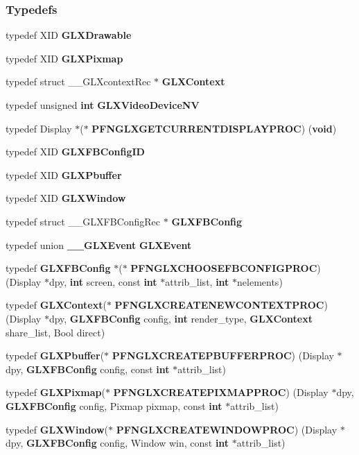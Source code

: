 \subsubsection*{Typedefs}
\begin{DoxyCompactItemize}
\item 
typedef X\+ID {\bf G\+L\+X\+Drawable}
\item 
typedef X\+ID {\bf G\+L\+X\+Pixmap}
\item 
typedef struct \+\_\+\+\_\+\+G\+L\+Xcontext\+Rec $\ast$ {\bf G\+L\+X\+Context}
\item 
typedef unsigned {\bf int} {\bf G\+L\+X\+Video\+Device\+NV}
\item 
typedef Display $\ast$($\ast$ {\bf P\+F\+N\+G\+L\+X\+G\+E\+T\+C\+U\+R\+R\+E\+N\+T\+D\+I\+S\+P\+L\+A\+Y\+P\+R\+OC}) ({\bf void})
\item 
typedef X\+ID {\bf G\+L\+X\+F\+B\+Config\+ID}
\item 
typedef X\+ID {\bf G\+L\+X\+Pbuffer}
\item 
typedef X\+ID {\bf G\+L\+X\+Window}
\item 
typedef struct \+\_\+\+\_\+\+G\+L\+X\+F\+B\+Config\+Rec $\ast$ {\bf G\+L\+X\+F\+B\+Config}
\item 
typedef union {\bf \+\_\+\+\_\+\+G\+L\+X\+Event} {\bf G\+L\+X\+Event}
\item 
typedef {\bf G\+L\+X\+F\+B\+Config} $\ast$($\ast$ {\bf P\+F\+N\+G\+L\+X\+C\+H\+O\+O\+S\+E\+F\+B\+C\+O\+N\+F\+I\+G\+P\+R\+OC}) (Display $\ast$dpy, {\bf int} screen, const {\bf int} $\ast$attrib\+\_\+list, {\bf int} $\ast$nelements)
\item 
typedef {\bf G\+L\+X\+Context}($\ast$ {\bf P\+F\+N\+G\+L\+X\+C\+R\+E\+A\+T\+E\+N\+E\+W\+C\+O\+N\+T\+E\+X\+T\+P\+R\+OC}) (Display $\ast$dpy, {\bf G\+L\+X\+F\+B\+Config} config, {\bf int} render\+\_\+type, {\bf G\+L\+X\+Context} share\+\_\+list, Bool direct)
\item 
typedef {\bf G\+L\+X\+Pbuffer}($\ast$ {\bf P\+F\+N\+G\+L\+X\+C\+R\+E\+A\+T\+E\+P\+B\+U\+F\+F\+E\+R\+P\+R\+OC}) (Display $\ast$dpy, {\bf G\+L\+X\+F\+B\+Config} config, const {\bf int} $\ast$attrib\+\_\+list)
\item 
typedef {\bf G\+L\+X\+Pixmap}($\ast$ {\bf P\+F\+N\+G\+L\+X\+C\+R\+E\+A\+T\+E\+P\+I\+X\+M\+A\+P\+P\+R\+OC}) (Display $\ast$dpy, {\bf G\+L\+X\+F\+B\+Config} config, Pixmap pixmap, const {\bf int} $\ast$attrib\+\_\+list)
\item 
typedef {\bf G\+L\+X\+Window}($\ast$ {\bf P\+F\+N\+G\+L\+X\+C\+R\+E\+A\+T\+E\+W\+I\+N\+D\+O\+W\+P\+R\+OC}) (Display $\ast$dpy, {\bf G\+L\+X\+F\+B\+Config} config, Window win, const {\bf int} $\ast$attrib\+\_\+list)

\end{DoxyCompactItemize}
